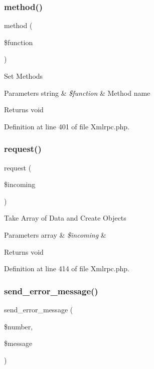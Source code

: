 \subsubsection{\texorpdfstring{method()}{method()}}
{\footnotesize\ttfamily method (\begin{DoxyParamCaption}\item[{}]{\$function }\end{DoxyParamCaption})}

Set Methods


\begin{DoxyParams}[1]{Parameters}
string & {\em \$function} & Method name \\
\hline
\end{DoxyParams}
\begin{DoxyReturn}{Returns}
void 
\end{DoxyReturn}


Definition at line 401 of file Xmlrpc.\+php.

\mbox{\label{class_c_i___xmlrpc_a10d4ec842c61f2301ecccc900500e4c8}} 
\subsubsection{\texorpdfstring{request()}{request()}}
{\footnotesize\ttfamily request (\begin{DoxyParamCaption}\item[{}]{\$incoming }\end{DoxyParamCaption})}

Take Array of Data and Create Objects


\begin{DoxyParams}[1]{Parameters}
array & {\em \$incoming} & \\
\hline
\end{DoxyParams}
\begin{DoxyReturn}{Returns}
void 
\end{DoxyReturn}


Definition at line 414 of file Xmlrpc.\+php.

\mbox{\label{class_c_i___xmlrpc_a024ae8a44e09995c6d0b6cb50d8abd9a}} 
\subsubsection{\texorpdfstring{send\_error\_message()}{send\_error\_message()}}
{\footnotesize\ttfamily send\+\_\+error\+\_\+message (\begin{DoxyParamCaption}\item[{}]{\$number,  }\item[{}]{\$message }\end{DoxyParamCaption})}

